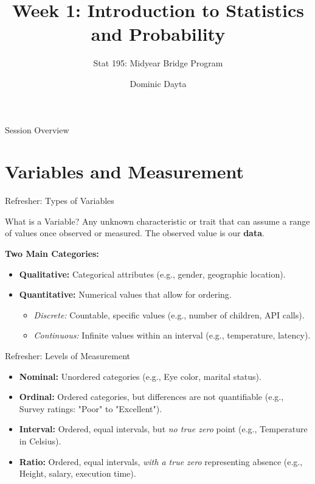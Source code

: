 \documentclass[aspectratio=169]{beamer}
\title{Week 1: Introduction to Statistics and Probability}
\subtitle{Stat 195: Midyear Bridge Program}
\author{Dominic Dayta}
\begin{document}
\begin{frame}
    \titlepage
\end{frame}

\begin{frame}{Session Overview}
    \tableofcontents
\end{frame}

\section{Variables and Measurement}

\begin{frame}{Refresher: Types of Variables}
    \begin{block}{What is a Variable?}
        Any unknown characteristic or trait that can assume a range of values once observed or measured. The observed value is our \textbf{data}.
    \end{block}
    
    \vspace{0.5cm}
    \textbf{Two Main Categories:}
    \begin{itemize}
        \item \textbf{Qualitative:} Categorical attributes (e.g., gender, geographic location).
        \item \textbf{Quantitative:} Numerical values that allow for ordering.
        \begin{itemize}
            \item \emph{Discrete:} Countable, specific values (e.g., number of children, API calls).
            \item \emph{Continuous:} Infinite values within an interval (e.g., temperature, latency).
        \end{itemize}
    \end{itemize}
\end{frame}

\begin{frame}{Refresher: Levels of Measurement}
    \begin{itemize}
        \item \textbf{Nominal:} Unordered categories (e.g., Eye color, marital status).
        \item \textbf{Ordinal:} Ordered categories, but differences are not quantifiable (e.g., Survey ratings: "Poor" to "Excellent").
        \item \textbf{Interval:} Ordered, equal intervals, but \emph{no true zero} point (e.g., Temperature in Celsius).
        \item \textbf{Ratio:} Ordered, equal intervals, \emph{with a true zero} representing absence (e.g., Height, salary, execution time).
    \end{itemize}
\end{frame}
\end{document}
